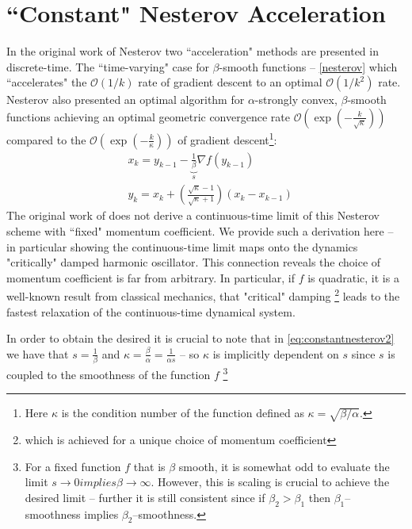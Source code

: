 \section{``Constant" Nesterov Acceleration}
In the original work of Nesterov \cite{DBLP:journals/ftml/Bubeck15, nesterov2004introductory} two ``acceleration" methods are presented in discrete-time. The ``time-varying" case for $\beta$-smooth functions -- \eqref{nesterov} which ``accelerates" the $\mathcal{O}(1/k)$ rate of gradient descent to an optimal $\mathcal{O}(1/k^2)$ rate. Nesterov also presented an optimal algorithm for $\alpha$-strongly convex, $\beta$-smooth functions achieving an optimal geometric convergence rate $\mathcal{O} \left (\exp(-\frac{k}{\sqrt{\kappa}}) \right)$ compared to the $\mathcal{O} \left (\exp(-\frac{k}{\kappa}) \right)$ of gradient descent\footnote{Here $\kappa$ is the condition number of the function defined as $\kappa = \sqrt{\beta/\alpha}$.}:
\begin{align}
    & x_{k} = y_{k-1} - \underbrace{\frac{1}{\beta}}_{s} \nabla f(y_{k-1}) \label{eq:constantnesterov1} \\
    & y_{k} = x_{k} + \left( \frac{\sqrt{\kappa}-1}{\sqrt{\kappa}+1} \right) \left( x_{k} - x_{k-1} \right)  \label{eq:constantnesterov2}
\end{align}
 The original work of \cite{su2014differential} does not derive a continuous-time limit of this Nesterov scheme with ``fixed" momentum coefficient. We provide such a derivation here -- in particular showing the continuous-time limit maps onto the dynamics "critically" damped harmonic oscillator. This connection reveals the choice of momentum coefficient is far from arbitrary. In particular, if $f$ is quadratic, it is a well-known result from classical mechanics, that "critical" damping \footnote{which is achieved for a unique choice of momentum coefficient} leads to the fastest relaxation of the continuous-time dynamical system.
 
 \begin{comment}
 Perhaps surprisingly, \cite{su2014differential} notes \textit{it is not possible} for a continuous-time ODE to generically achieve a non-polynomial (i.e. exponential) convergence rate -- making the continuous-time study of \eqref{eq:constantnesterov1} less interesting. 
 \end{comment}
 
 In order to obtain the desired it is crucial to note that in \eqref{eq:constantnesterov2} we have that $s = \frac{1}{\beta}$ and $\kappa = \frac{\beta}{\alpha} = \frac{1}{\alpha s}$ -- so $\kappa$ is implicitly dependent on $s$ since $s$ is coupled to the smoothness of the function $f$ \footnote{For a fixed function $f$ that is $\beta$ smooth, it is somewhat odd to evaluate the limit $s \to 0 implies \beta \to \infty$. However, this is scaling is crucial to achieve the desired limit -- further it is still consistent since if $\beta_2 > \beta_1$ then $\beta_1$--smoothness implies $\beta_2$--smoothness.}
 
